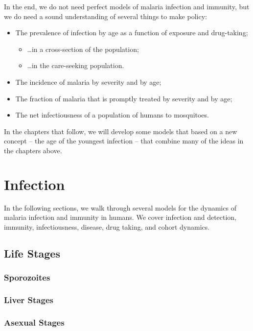 \documentclass[
]{book}
\begin{document}
In the end, we do not need perfect models of malaria infection and immunity, but we do need a sound understanding of several things to make policy:

\begin{itemize}
\item
  The prevalence of infection by age as a function of exposure and drug-taking;

  \begin{itemize}
  \item
    \ldots in a cross-section of the population;
  \item
    \ldots in the care-seeking population.
  \end{itemize}
\item
  The incidence of malaria by severity and by age;
\item
  The fraction of malaria that is promptly treated by severity and by age;
\item
  The net infectiousness of a population of humans to mosquitoes.
\end{itemize}

In the chapters that follow, we will develop some models that based on a new concept -- the age of the youngest infection -- that combine many of the ideas in the chapters above.

\chapter{Infection}\label{infection-2}

In the following sections, we walk through several models for the dynamics of malaria infection and immunity in humans. We cover infection and detection, immunity, infectiousness, disease, drug taking, and cohort dynamics.

\section{Life Stages}\label{life-stages}

\subsection{Sporozoites}\label{sporozoites}

\subsection{Liver Stages}\label{liver-stages}

\subsection{Asexual Stages}\label{asexual-stages}
\end{document}
